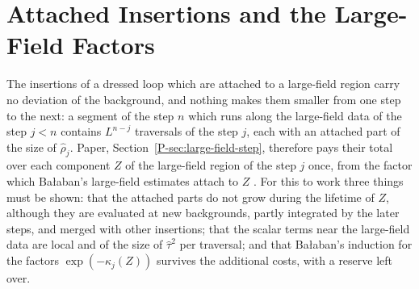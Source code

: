 \documentclass[11pt]{preprint}
\numberwithin{equation}{section}
\theoremstyle{definition}
\theoremstyle{remark}
\theoremstyle{plain}
\begin{document}
\section{Attached Insertions and the Large-Field Factors}\label{sec:attached}

The insertions of a dressed loop which are attached to a large-field region carry no deviation of the background, and nothing makes them smaller from one step to the next: a segment of the step $n$ which runs along the large-field data of the step $j < n$ contains $L^{n-j}$ traversals of the step $j$, each with an attached part of the size of $\hat\rho_j$. Paper, Section~\ref{P-sec:large-field-step}, therefore pays their total over each component $Z$ of the large-field region of the step $j$ once, from the factor which Ba{\l}aban's large-field estimates attach to $Z$ \cite[pp.~381, 384]{BalabanLFR2}. For this to work three things must be shown: that the attached parts do not grow during the lifetime of $Z$, although they are evaluated at new backgrounds, partly integrated by the later steps, and merged with other insertions; that the scalar terms near the large-field data are local and of the size of $\hat\tau^2$ per traversal; and that Ba{\l}aban's induction for the factors $\exp(-\kappa_j(Z))$ \cite[(1.80)--(1.89), pp.~384--387]{BalabanLFR2} survives the additional costs, with a reserve left over.
\end{document}
